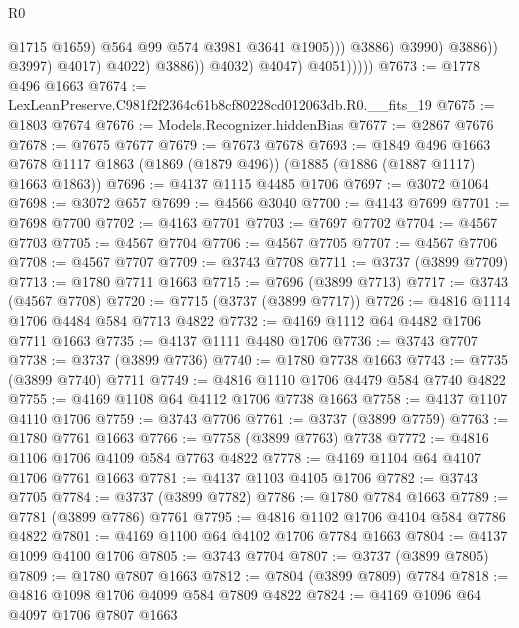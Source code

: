 \begin{lexlean}{R0}
\begin{coremodule}
                                            @1715
                                            @1659)
                                          @564
                                          @99
                                          @574
                                          @3981
                                          @3641
                                          @1905)))
                                    @3886)
                                  @3990)
                                @3886))
                            @3997)
                          @4017)
                        @4022)
                      @3886))
                  @4032)
                @4047)
              @4051)))))
@7673 := @1778 @496 @1663
@7674 := LexLeanPreserve.C981f2f2364c61b8cf80228cd012063db.R0.__fits_19
@7675 := @1803 @7674
@7676 := Models.Recognizer.hiddenBias
@7677 := @2867 @7676
@7678 := @7675 @7677
@7679 := @7673 @7678
@7693 := @1849
    @496
    @1663
    @7678
    @1117
    @1863
    (@1869 (@1879 @496))
    (@1885 (@1886 (@1887 @1117) @1663 @1863))
@7696 := @4137 @1115 @4485 @1706
@7697 := @3072 @1064
@7698 := @3072 @657
@7699 := @4566 @3040
@7700 := @4143 @7699
@7701 := @7698 @7700
@7702 := @4163 @7701
@7703 := @7697 @7702
@7704 := @4567 @7703
@7705 := @4567 @7704
@7706 := @4567 @7705
@7707 := @4567 @7706
@7708 := @4567 @7707
@7709 := @3743 @7708
@7711 := @3737 (@3899 @7709)
@7713 := @1780 @7711 @1663
@7715 := @7696 (@3899 @7713)
@7717 := @3743 (@4567 @7708)
@7720 := @7715 (@3737 (@3899 @7717))
@7726 := @4816 @1114 @1706 @4484 @584 @7713 @4822
@7732 := @4169 @1112 @64 @4482 @1706 @7711 @1663
@7735 := @4137 @1111 @4480 @1706
@7736 := @3743 @7707
@7738 := @3737 (@3899 @7736)
@7740 := @1780 @7738 @1663
@7743 := @7735 (@3899 @7740) @7711
@7749 := @4816 @1110 @1706 @4479 @584 @7740 @4822
@7755 := @4169 @1108 @64 @4112 @1706 @7738 @1663
@7758 := @4137 @1107 @4110 @1706
@7759 := @3743 @7706
@7761 := @3737 (@3899 @7759)
@7763 := @1780 @7761 @1663
@7766 := @7758 (@3899 @7763) @7738
@7772 := @4816 @1106 @1706 @4109 @584 @7763 @4822
@7778 := @4169 @1104 @64 @4107 @1706 @7761 @1663
@7781 := @4137 @1103 @4105 @1706
@7782 := @3743 @7705
@7784 := @3737 (@3899 @7782)
@7786 := @1780 @7784 @1663
@7789 := @7781 (@3899 @7786) @7761
@7795 := @4816 @1102 @1706 @4104 @584 @7786 @4822
@7801 := @4169 @1100 @64 @4102 @1706 @7784 @1663
@7804 := @4137 @1099 @4100 @1706
@7805 := @3743 @7704
@7807 := @3737 (@3899 @7805)
@7809 := @1780 @7807 @1663
@7812 := @7804 (@3899 @7809) @7784
@7818 := @4816 @1098 @1706 @4099 @584 @7809 @4822
@7824 := @4169 @1096 @64 @4097 @1706 @7807 @1663

\end{coremodule}
\end{lexlean}

